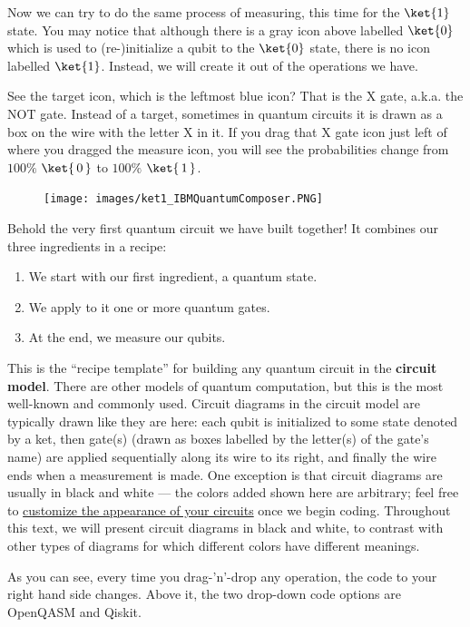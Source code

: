 \documentclass{article}
\theoremstyle{definition}
\newcommand{\kz}[1]{\ket{\,#1\,}}
\begin{document}
Now we can try to do the same process of measuring, this time for the $\ket{1}$ state.  You may notice that although there is a gray icon above labelled $\ket{0}$ which is used to (re-)initialize a qubit to the $\ket{0}$ state, there is no icon labelled $\ket{1}$.  Instead, we will create it out of the operations we have.

See the target icon, which is the leftmost blue icon?  That is the X gate, a.k.a. the NOT gate.  Instead of a target, sometimes in quantum circuits it is drawn as a box on the wire with the letter X in it.
If you drag that X gate icon just left of where you dragged the measure icon, you will see the probabilities change from $100\%$ $\kz0$ to $100\%$ $\kz1$.
\begin{figure}[H]
	\texttt{[image: images/ket1\_IBMQuantumComposer.PNG]}
	\label{fig:myfirstcircuit}
\end{figure}

Behold the very first quantum circuit we have built together!  It combines our three ingredients in a recipe:
\begin{enumerate}
	\item We start with our first ingredient, a quantum state.
	\item We apply to it one or more quantum gates.
	\item At the end, we measure our qubits.
\end{enumerate}
This is the ``recipe template'' for building any quantum circuit in the \textbf{circuit model}.  There are other models of quantum computation, but this is the most well-known and commonly used.  Circuit diagrams in the circuit model are typically drawn like they are here: each qubit is initialized to some state denoted by a ket, then gate(s) (drawn as boxes labelled by the letter(s) of the gate's name) are applied sequentially along its wire to its right, and finally the wire ends when a measurement is made.  One exception is that circuit diagrams are usually in black and white --- the colors added shown here are arbitrary; feel free to \href{https://medium.com/qiskit/learn-how-to-customize-the-appearance-of-your-qiskit-circuits-with-accessibility-in-mind-b9b59fc039f3}{customize the appearance of your circuits} once we begin coding.  Throughout this text, we will present circuit diagrams in black and white, to contrast with other types of diagrams for which different colors have different meanings.

As you can see, every time you drag-'n'-drop any operation, the code to your right hand side changes.  Above it, the two drop-down code options are OpenQASM and Qiskit.
\end{document}

